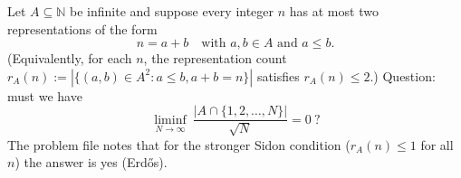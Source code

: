 Let $A\subseteq\mathbb N$ be infinite and suppose every integer $n$ has at most two representations of the form
\[
 n=a+b\quad\text{with }a,b\in A\text{ and }a\le b.
\]
(Equivalently, for each $n$, the representation count $r_A(n):=|\{(a,b)\in A^2:a\le b, a+b=n\}|$ satisfies $r_A(n)\le 2$.)
Question: must we have
\[
\liminf_{N\to\infty}\ \frac{|A\cap\{1,2,\dots,N\}|}{\sqrt N}=0\ ?
\]
The problem file notes that for the stronger Sidon condition ($r_A(n)\le 1$ for all $n$) the answer is yes (Erd\H{o}s).
